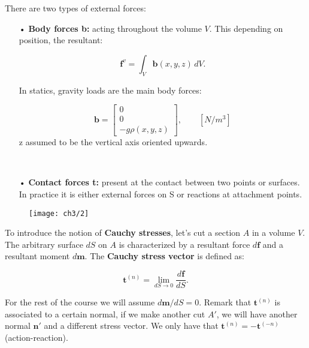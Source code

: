 		There are two types of external forces: 
		\begin{itemize}
			\item[•] \textbf{Body forces b:} acting throughout the volume $V$. This depending on position, the resultant:
			
			\begin{equation}
				\mathbf{f}^v = \int _V \mathbf{b}(x,y,z) \, dV.
			\end{equation}
			
			In statics, gravity loads are the main body forces: 
			
			\begin{equation}
			\mathbf{b} = \left[
			\begin{array}{c}
			0\\
			0\\
			- g\rho (x,y,z)
			\end{array}
			 \right], \qquad [N/m^3]
			\end{equation}
			z assumed to be the vertical axis oriented upwards. 
			
		\	\item[•] \textbf{Contact forces t:} present at the contact between two points or surfaces. In practice it is either external forces on S or reactions at attachment points. 
		\end{itemize}
		
		\begin{wrapfigure}[8]{l}{5cm}
		\vspace{-5mm}	
		\texttt{[image: ch3/2]}
		\end{wrapfigure}		
		To introduce the notion of \textbf{Cauchy stresses}, let's cut a section $A$ in a volume $V$. The arbitrary surface $dS$ on $A$ is characterized by a resultant force $d\mathbf{f}$ and a resultant moment $d\mathbf{m}$. The \textbf{Cauchy stress vector} is defined as: 
		
		\begin{equation}
		\mathbf{t}^{(n)} = \lim _{dS\rightarrow 0} \frac{d\mathbf{f}}{dS}. 
		\end{equation}
		
		For the rest of the course we will assume $d\mathbf{m}/dS = 0$. Remark that $\mathbf{t}^{(n)}$ is associated to a certain normal, if we make another cut $A'$, we will have another normal $\bm{n}'$ and a different stress vector. We only have that $\mathbf{t}^{(n)} = -\mathbf{t}^{(-n)}$ (action-reaction). \\
		
